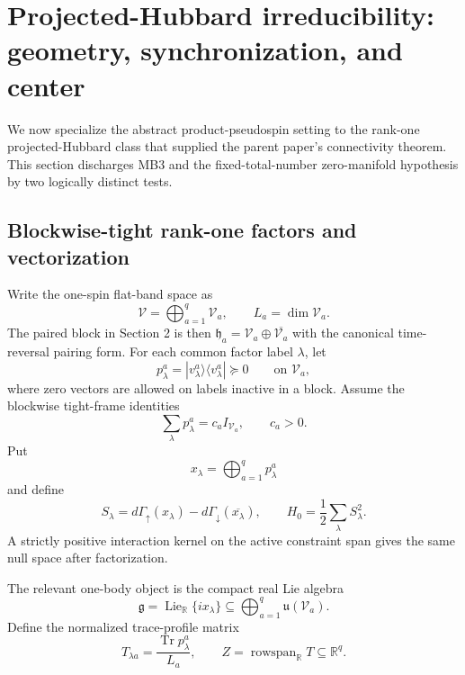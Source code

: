 \documentclass[11pt]{article}
\numberwithin{equation}{section}
\newcommand{\Tr}{\operatorname{Tr}}
\newcommand{\cV}{\mathcal V}
\newcommand{\fg}{\mathfrak g}
\newcommand{\Lie}{\operatorname{Lie}}
\newcommand{\rowspan}{\operatorname{rowspan}}
\begin{document}
\section{Projected-Hubbard irreducibility: geometry, synchronization, and center}
\label{sec:projected-irred}

We now specialize the abstract product-pseudospin setting to the rank-one projected-Hubbard class that supplied the parent paper's connectivity theorem.  This section discharges MB3 and the fixed-total-number zero-manifold hypothesis by two logically distinct tests.

\subsection{Blockwise-tight rank-one factors and vectorization}

Write the one-spin flat-band space as
\begin{equation}
 \cV=\bigoplus_{a=1}^q\cV_a,
 \qquad
 L_a=\dim\cV_a.
 \label{eq:V-blocks}
\end{equation}
The paired block in Section 2 is then $\mathfrak h_a=\cV_a\oplus\overline{\cV_a}$ with the canonical time-reversal pairing form.  For each common factor label $\lambda$, let
\begin{equation}
 p_\lambda^a=|v_\lambda^a\rangle\langle v_\lambda^a|\succeq0
 \qquad\text{on }\cV_a,
 \label{eq:p-lambda-a}
\end{equation}
where zero vectors are allowed on labels inactive in a block.  Assume the blockwise tight-frame identities
\begin{equation}
 \sum_\lambda p_\lambda^a=c_aI_{\cV_a},
 \qquad
 c_a>0.
 \label{eq:blockwise-tight}
\end{equation}
Put
\begin{equation}
 x_\lambda=\bigoplus_{a=1}^q p_\lambda^a
 \label{eq:x-lambda}
\end{equation}
and define
\begin{equation}
 S_\lambda
 =
 d\Gamma_\uparrow(x_\lambda)
 -
 d\Gamma_\downarrow(\overline{x_\lambda}),
 \qquad
 H_0=\frac12\sum_\lambda S_\lambda^2.
 \label{eq:multiblock-Hubbard}
\end{equation}
A strictly positive interaction kernel on the active constraint span gives the same null space after factorization.

The relevant one-body object is the compact real Lie algebra
\begin{equation}
 \fg
 =
 \Lie_{\mathbb R}\{ix_\lambda\}
 \subseteq
 \bigoplus_{a=1}^q\mathfrak u(\cV_a).
 \label{eq:joint-lie}
\end{equation}
Define the normalized trace-profile matrix
\begin{equation}
 T_{\lambda a}
 =
 \frac{\Tr p_\lambda^a}{L_a},
 \qquad
 Z=\rowspan_{\mathbb R}T\subseteq\mathbb R^q.
 \label{eq:trace-profile}
\end{equation}
\end{document}
